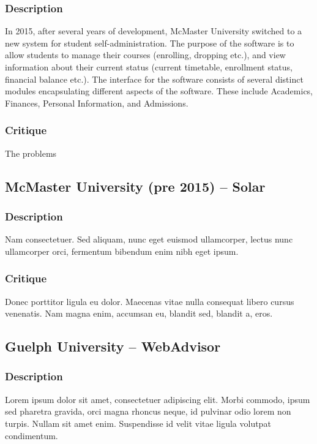 \documentclass[10pt]{article}
\begin{document}
\begin{multicols}{2}
\subsubsection*{Description}
In 2015, after several years of development, McMaster University switched to a new system for student self-administration. The purpose of the software is to allow students to manage their courses (enrolling, dropping etc.), and view information about their current status (current timetable, enrollment status, financial balance etc.). The interface for the software consists of several distinct modules encapsulating different aspects of the software. These include Academics, Finances, Personal Information, and Admissions.

\subsubsection*{Critique}
The problems

\subsection*{McMaster University (pre 2015) -- Solar}
\subsubsection*{Description}
Nam consectetuer. Sed aliquam, nunc eget euismod ullamcorper, lectus nunc ullamcorper orci, fermentum bibendum enim nibh eget ipsum. 

\subsubsection*{Critique}
Donec porttitor ligula eu dolor. Maecenas vitae nulla consequat libero cursus venenatis. Nam magna enim, accumsan eu, blandit sed, blandit a, eros.

\subsection*{Guelph University -- WebAdvisor}
\subsubsection*{Description}
Lorem ipsum dolor sit amet, consectetuer adipiscing elit. Morbi commodo, ipsum sed pharetra gravida, orci magna rhoncus neque, id pulvinar odio lorem non turpis. Nullam sit amet enim. Suspendisse id velit vitae ligula volutpat condimentum. 


\end{multicols}
\end{document}
